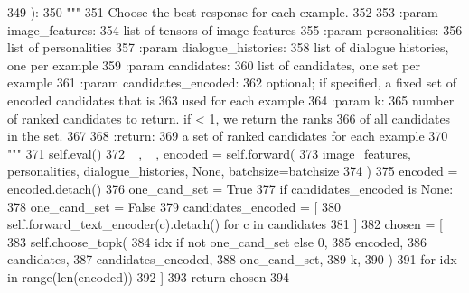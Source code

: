 \begin{DoxyCode}
349     ):
350         \textcolor{stringliteral}{"""}
351 \textcolor{stringliteral}{        Choose the best response for each example.}
352 \textcolor{stringliteral}{}
353 \textcolor{stringliteral}{        :param image\_features:}
354 \textcolor{stringliteral}{            list of tensors of image features}
355 \textcolor{stringliteral}{        :param personalities:}
356 \textcolor{stringliteral}{            list of personalities}
357 \textcolor{stringliteral}{        :param dialogue\_histories:}
358 \textcolor{stringliteral}{            list of dialogue histories, one per example}
359 \textcolor{stringliteral}{        :param candidates:}
360 \textcolor{stringliteral}{            list of candidates, one set per example}
361 \textcolor{stringliteral}{        :param candidates\_encoded:}
362 \textcolor{stringliteral}{            optional; if specified, a fixed set of encoded candidates that is}
363 \textcolor{stringliteral}{            used for each example}
364 \textcolor{stringliteral}{        :param k:}
365 \textcolor{stringliteral}{            number of ranked candidates to return. if < 1, we return the ranks}
366 \textcolor{stringliteral}{            of all candidates in the set.}
367 \textcolor{stringliteral}{}
368 \textcolor{stringliteral}{        :return:}
369 \textcolor{stringliteral}{            a set of ranked candidates for each example}
370 \textcolor{stringliteral}{        """}
371         self.eval()
372         \_, \_, encoded = self.forward(
373             image\_features, personalities, dialogue\_histories, \textcolor{keywordtype}{None}, batchsize=batchsize
374         )
375         encoded = encoded.detach()
376         one\_cand\_set = \textcolor{keyword}{True}
377         \textcolor{keywordflow}{if} candidates\_encoded \textcolor{keywordflow}{is} \textcolor{keywordtype}{None}:
378             one\_cand\_set = \textcolor{keyword}{False}
379             candidates\_encoded = [
380                 self.forward\_text\_encoder(c).detach() \textcolor{keywordflow}{for} c \textcolor{keywordflow}{in} candidates
381             ]
382         chosen = [
383             self.choose\_topk(
384                 idx \textcolor{keywordflow}{if} \textcolor{keywordflow}{not} one\_cand\_set \textcolor{keywordflow}{else} 0,
385                 encoded,
386                 candidates,
387                 candidates\_encoded,
388                 one\_cand\_set,
389                 k,
390             )
391             \textcolor{keywordflow}{for} idx \textcolor{keywordflow}{in} range(len(encoded))
392         ]
393         \textcolor{keywordflow}{return} chosen
394 
\end{DoxyCode}
